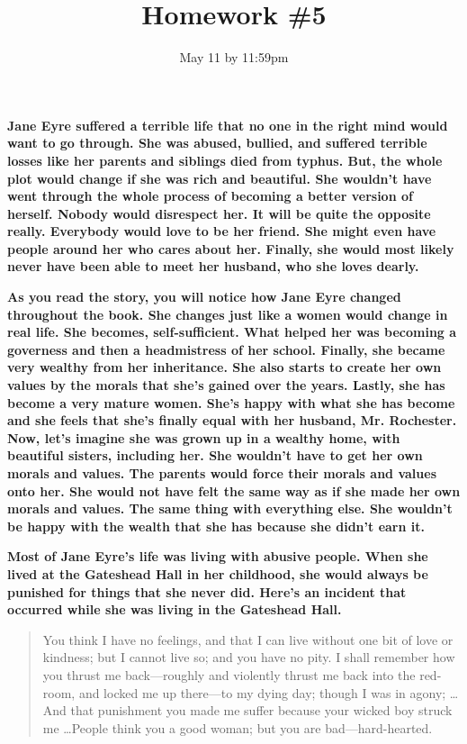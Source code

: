 \title{Homework \#5} %
\date{May 11 by 11:59pm}

\textbf{Jane Eyre suffered a terrible life that no one in the right mind would
  want to go through. She was abused, bullied, and suffered terrible losses like
  her parents and siblings died from typhus. But, the whole plot would change if
  she was rich and beautiful. She wouldn't have went through the whole process
  of becoming a better version of herself. Nobody would disrespect her. It will
  be quite the opposite really. Everybody would love to be her friend. She might
  even have people around her who cares about her. Finally, she would most
  likely never have been able to meet her husband, who she loves dearly.}

\textbf{As you read the story, you will notice how Jane Eyre changed throughout
  the book. She changes just like a women would change in real life. She
  becomes, self-sufficient. What helped her was becoming a governess and then a
  headmistress of her school. Finally, she became very wealthy from her
  inheritance. She also starts to create her own values by the morals that she's
  gained over the years. Lastly, she has become a very mature women. She's happy
  with what she has become and she feels that she's finally equal with her
  husband, Mr. Rochester.} \cite{noauthor_jane_nodate}
  \textbf{Now, let's imagine she was grown up in a wealthy home, with beautiful
  sisters, including her. She wouldn't have to get her own morals and values.
  The parents would force their morals and values onto her. She would not have
  felt the same way as if she made her own morals and values. The same thing
  with everything else. She wouldn't be happy with the wealth that she has because
  she didn't earn it.}

\textbf{Most of Jane Eyre's life was living with abusive people. When she lived
  at the Gateshead Hall in her childhood, she would always be punished for things
  that she never did. Here's an incident that occurred while she was living in the
  Gateshead Hall.}

\begin{quotation}
  You think I have no feelings, and that I can live without one bit of love or
  kindness; but I cannot live so; and you have no pity. I shall remember how you
  thrust me back—roughly and violently thrust me back into the red-room, and
  locked me up there—to my dying day; though I was in agony; \ldots And that punishment
  you made me suffer because your wicked boy struck me \ldots People think you a good
  woman; but you are bad—hard-hearted. \cite{charlotte_project_1998}
\end{quotation}

